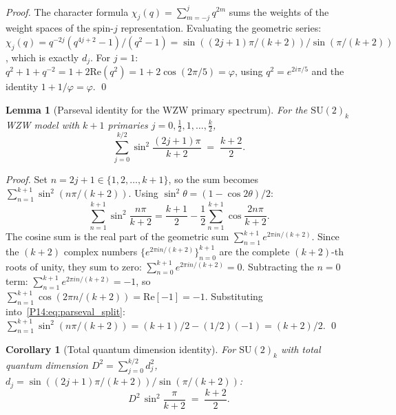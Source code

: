 \documentclass[11pt,a4paper]{article}
\newtheorem{lemma}[theorem]{Lemma}
\newtheorem{corollary}[theorem]{Corollary}
\theoremstyle{definition}
\theoremstyle{remark}
\newcommand{\vp}{\varphi}
\begin{document}
\begin{proof}
The character formula $\chi_j(q) = \sum_{m=-j}^{j} q^{2m}$ sums
the weights of the weight spaces of the spin-$j$ representation.
Evaluating the geometric series:
$\chi_j(q) = q^{-2j}(q^{4j+2}-1)/(q^2-1) = \sin((2j+1)\pi/(k+2))/\sin(\pi/(k+2))$,
which is exactly $d_j$.
For $j=1$: $q^2+1+q^{-2} = 1+2\mathrm{Re}(q^2)=1+2\cos(2\pi/5)=\vp$,
using $q^2=e^{2i\pi/5}$ and the identity $1+1/\vp=\vp$.
\qed
\end{proof}

\begin{lemma}[Parseval identity for the WZW primary spectrum]
\label{P14:lem:parseval}
For the $\mathrm{SU}(2)_k$ WZW model with $k+1$ primaries
$j = 0, \tfrac{1}{2}, 1, \ldots, \tfrac{k}{2}$,
\begin{equation}
  \sum_{j=0}^{k/2} \sin^2\!\frac{(2j+1)\pi}{k+2}
  \;=\; \frac{k+2}{2}.
  \label{P14:eq:parseval_wzw}
\end{equation}
\end{lemma}

\begin{proof}
Set $n = 2j+1 \in \{1, 2, \ldots, k+1\}$, so the sum becomes
$\sum_{n=1}^{k+1}\sin^2(n\pi/(k+2))$.
Using $\sin^2\theta = (1-\cos 2\theta)/2$:
\begin{equation}
  \sum_{n=1}^{k+1}\sin^2\!\frac{n\pi}{k+2}
  = \frac{k+1}{2}
    - \frac{1}{2}\sum_{n=1}^{k+1}\cos\!\frac{2n\pi}{k+2}.
  \label{P14:eq:parseval_split}
\end{equation}
The cosine sum is the real part of the geometric sum
$\sum_{n=1}^{k+1} e^{2\pi in/(k+2)}$.
Since the $(k+2)$ complex numbers $\{e^{2\pi in/(k+2)}\}_{n=0}^{k+1}$
are the complete $(k+2)$-th roots of unity, they sum to zero:
$\sum_{n=0}^{k+1}e^{2\pi in/(k+2)} = 0$.
Subtracting the $n=0$ term:
$\sum_{n=1}^{k+1} e^{2\pi in/(k+2)} = -1$,
so $\sum_{n=1}^{k+1}\cos(2\pi n/(k+2)) = \mathrm{Re}[-1] = -1$.
Substituting into~\eqref{P14:eq:parseval_split}:
$\sum_{n=1}^{k+1}\sin^2(n\pi/(k+2)) = (k+1)/2 - (1/2)(-1) = (k+2)/2$.
\qed
\end{proof}

\begin{corollary}[Total quantum dimension identity]
\label{P14:cor:D2_parseval}
For $\mathrm{SU}(2)_k$ with total quantum dimension
$D^2 = \sum_{j=0}^{k/2} d_j^2$, $d_j = \sin((2j+1)\pi/(k+2))/\sin(\pi/(k+2))$:
\begin{equation}
  D^2\,\sin^2\!\frac{\pi}{k+2}
  \;=\; \frac{k+2}{2}.
  \label{P14:eq:D2_sin2}
\end{equation}
\end{corollary}
\end{document}
